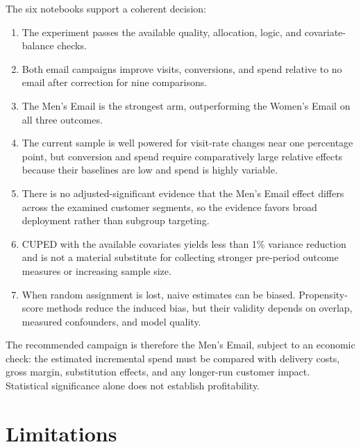 \documentclass[11pt]{article}
\begin{document}
The six notebooks support a coherent decision:
\begin{enumerate}
    \item The experiment passes the available quality, allocation, logic, and covariate-balance checks.
    \item Both email campaigns improve visits, conversions, and spend relative to no email after correction for nine comparisons.
    \item The Men's Email is the strongest arm, outperforming the Women's Email on all three outcomes.
    \item The current sample is well powered for visit-rate changes near one percentage point, but conversion and spend require comparatively large relative effects because their baselines are low and spend is highly variable.
    \item There is no adjusted-significant evidence that the Men's Email effect differs across the examined customer segments, so the evidence favors broad deployment rather than subgroup targeting.
    \item CUPED with the available covariates yields less than 1\% variance reduction and is not a material substitute for collecting stronger pre-period outcome measures or increasing sample size.
    \item When random assignment is lost, naive estimates can be biased. Propensity-score methods reduce the induced bias, but their validity depends on overlap, measured confounders, and model quality.
\end{enumerate}

The recommended campaign is therefore the Men's Email, subject to an economic check: the estimated incremental spend must be compared with delivery costs, gross margin, substitution effects, and any longer-run customer impact. Statistical significance alone does not establish profitability.

\section{Limitations}
\end{document}
